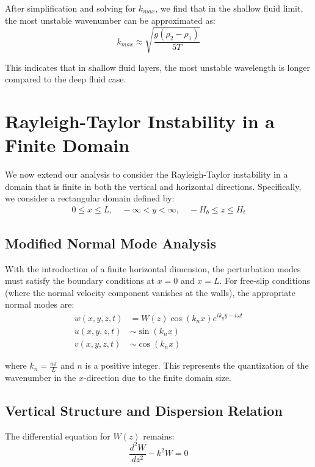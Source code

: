 \documentclass[12pt,a4paper]{article}
\begin{document}
After simplification and solving for $k_{max}$, we find that in the shallow fluid limit, the most unstable wavenumber can be approximated as:
\begin{equation}
k_{max} \approx \sqrt{\frac{g(\rho_2 - \rho_1)}{5T}}
\end{equation}

This indicates that in shallow fluid layers, the most unstable wavelength is longer compared to the deep fluid case.

\section{Rayleigh-Taylor Instability in a Finite Domain}
We now extend our analysis to consider the Rayleigh-Taylor instability in a domain that is finite in both the vertical and horizontal directions. Specifically, we consider a rectangular domain defined by:
\begin{align}
0 \leq x \leq L, \quad -\infty < y < \infty, \quad -H_b \leq z \leq H_t
\end{align}

\subsection{Modified Normal Mode Analysis}
With the introduction of a finite horizontal dimension, the perturbation modes must satisfy the boundary conditions at $x = 0$ and $x = L$. For free-slip conditions (where the normal velocity component vanishes at the walls), the appropriate normal modes are:
\begin{align}
w(x,y,z,t) &= W(z)\cos(k_n x)e^{ik_y y - i\omega t} \\
u(x,y,z,t) &\sim \sin(k_n x) \\
v(x,y,z,t) &\sim \cos(k_n x)
\end{align}

where $k_n = \frac{n\pi}{L}$ and $n$ is a positive integer. This represents the quantization of the wavenumber in the $x$-direction due to the finite domain size.

\subsection{Vertical Structure and Dispersion Relation}
The differential equation for $W(z)$ remains:
\begin{equation}
\frac{d^2W}{dz^2} - k^2W = 0
\end{equation}
\end{document}

